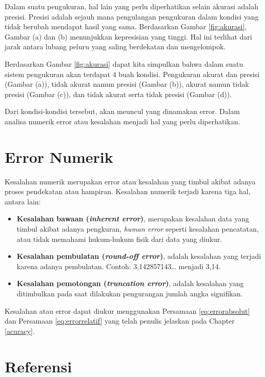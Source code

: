 \documentclass[
]{book}
\theoremstyle{definition}
\theoremstyle{definition}
\theoremstyle{definition}
\theoremstyle{definition}
\theoremstyle{remark}
\begin{document}
Dalam suatu pengukuran, hal lain yang perlu diperhatikan selain akurasi adalah presisi. Presisi adalah sejauh mana pengulangan pengukuran dalam kondisi yang tidak berubah mendapat hasil yang sama. Berdasarkan Gambar \ref{fig:akurasi}, Gambar (a) dan (b) menunjukkan kepresisian yang tinggi. Hal ini terlihat dari jarak antara lubang peluru yang saling berdekatan dan mengelompok.

Berdasarkan Gambar \ref{fig:akurasi} dapat kita simpulkan bahwa dalam suatu sistem pengukuran akan terdapat 4 buah kondisi. Pengukuran akurat dan presisi (Gambar (a)), tidak akurat namun presisi (Gambar (b)), akurat namun tidak presisi (Gambar (c)), dan tidak akurat serta tidak presisi (Gambar (d)).

Dari kondisi-kondisi tersebut, akan meuncul yang dinamakan error. Dalam analisa numerik error atau kesalahan menjadi hal yang perlu diperhatikan.

\hypertarget{numerror}{%
\section{Error Numerik}\label{numerror}}

Kesalahan numerik merupakan error atau kesalahan yang timbul akibat adanya proses pendekatan atau hampiran. Kesalahan numerik terjadi karena tiga hal, antara lain:

\begin{itemize}
\item
  \textbf{Kesalahan bawaan (\emph{inherent error})}, merupakan kesalahan data yang timbul akibat adanya pengkuran, \emph{human error} seperti kesalahan pencatatan, atau tidak memahami hukum-hukum fisik dari data yang diukur.
\item
  \textbf{Kesalahan pembulatan (\emph{round-off error})}, adalah kesalahan yang terjadi karena adanya pembulatan. Contoh: 3,142857143\ldots{} menjadi 3,14.
\item
  \textbf{Kesalahan pemotongan (\emph{truncation error})}, adalah kesalahan yang ditimbulkan pada saat dilakukan pengurangan jumlah angka signifikan.
\end{itemize}

Kesalahan atau error dapat diukur menggunakan Persamaan \eqref{eq:errorabsolut} dan Persamaan \eqref{eq:errorrelatif} yang telah penulis jelaskan pada Chapter \ref{acuracy}.

\hypertarget{referensi}{%
\section{Referensi}\label{referensi}}
\end{document}
